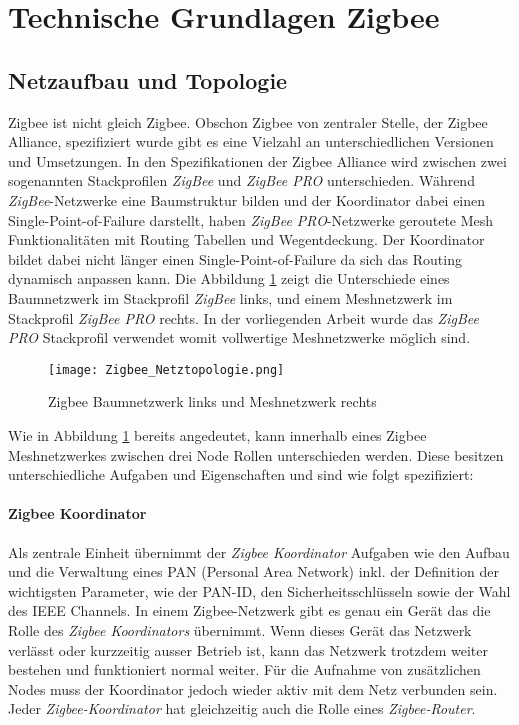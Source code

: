 \clearpage
\section{Technische Grundlagen Zigbee}\label{sec:TechnischeGrundlagenZigbee}

\subsection{Netzaufbau und Topologie}\label{subsec:ZigbeeNetzaufbauundTopologie}
Zigbee ist nicht gleich Zigbee.
Obschon Zigbee von zentraler Stelle, der Zigbee Alliance, spezifiziert wurde gibt es eine Vielzahl an unterschiedlichen Versionen und Umsetzungen.
In den Spezifikationen der Zigbee Alliance wird zwischen zwei sogenannten Stackprofilen \textit{ZigBee} und \textit{ZigBee PRO} unterschieden.
Während \textit{ZigBee}-Netzwerke eine Baumstruktur bilden und der Koordinator dabei einen Single-Point-of-Failure darstellt, haben \textit{ZigBee PRO}-Netzwerke geroutete Mesh Funktionalitäten mit Routing Tabellen und Wegentdeckung.
Der Koordinator bildet dabei nicht länger einen Single-Point-of-Failure da sich das Routing dynamisch anpassen kann.
Die Abbildung \ref{fig:NetzwerktopologienZigbee} zeigt die Unterschiede eines Baumnetzwerk im Stackprofil \textit{ZigBee} links, und einem Meshnetzwerk im Stackprofil \textit{ZigBee PRO} rechts.
In der vorliegenden Arbeit wurde das \textit{ZigBee PRO} Stackprofil verwendet womit vollwertige Meshnetzwerke möglich sind.

\begin{figure}[h]
	\centering
	\texttt{[image: Zigbee\_Netztopologie.png]}
	\caption{Zigbee Baumnetzwerk links und Meshnetzwerk rechts \cite[S.~221]{markus_krause_rainer_konrad_zigbee_2014}}	\label{fig:NetzwerktopologienZigbee}
\end{figure}

Wie in Abbildung \ref{fig:NetzwerktopologienZigbee} bereits angedeutet, kann innerhalb eines Zigbee Meshnetzwerkes zwischen drei Node Rollen unterschieden werden. Diese besitzen unterschiedliche Aufgaben und Eigenschaften und sind wie folgt spezifiziert:

\paragraph{Zigbee Koordinator}
Als zentrale Einheit übernimmt der \textit{Zigbee Koordinator} Aufgaben wie den Aufbau und die Verwaltung eines PAN (Personal Area Network) inkl. der Definition der wichtigsten Parameter, wie der PAN-ID, den Sicherheitsschlüsseln sowie der Wahl des IEEE Channels.
In einem Zigbee-Netzwerk gibt es genau ein Gerät das die Rolle des \textit{Zigbee Koordinators} übernimmt.
Wenn dieses Gerät das Netzwerk verlässt oder kurzzeitig ausser Betrieb ist, kann das Netzwerk trotzdem weiter bestehen und funktioniert normal weiter.
Für die Aufnahme von zusätzlichen Nodes muss der Koordinator jedoch wieder aktiv mit dem Netz verbunden sein.
Jeder \textit{Zigbee-Koordinator} hat gleichzeitig auch die Rolle eines \textit{Zigbee-Router}.

